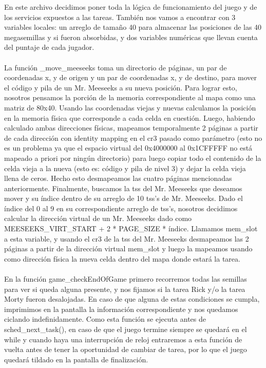 En este archivo decidimos poner toda la lógica de funcionamiento del juego y de los servicios expuestos a las tareas. También nos vamos a encontrar con 3 variables locales: un arreglo de tamaño 40 para almacenar las posiciones de las 40 megasemillas y si fueron absorbidas, y dos variables numéricas que llevan cuenta del puntaje de cada jugador.
\\\\
La función _move_meeseeks toma un directorio de páginas, un par de coordenadas x, y de origen y un par de coordenadas x, y de destino, para mover el código y pila de un Mr. Meeseeks a su nueva posición. Para lograr esto, nosotros pensamos la porción de la memoria correspondiente al mapa como una matriz de 80x40. Usando las coordenadas viejas y nuevas calculamos la posición en la memoria física que corresponde a cada celda en cuestión. Luego, habiendo calculado ambas direcciones físicas, mapeamos temporalmente 2 páginas a partir de cada dirección con identity mapping en el cr3 pasado como parámetro (esto no es un problema ya que el espacio virtual del 0x4000000 al 0x1CFFFFF no está mapeado a priori por ningún directorio) para luego copiar todo el contenido de la celda vieja a la nueva (esto es: código y pila de nivel 3) y dejar la celda vieja llena de ceros. Hecho esto desmapeamos las cuatro páginas mencionadas anteriormente. Finalmente, buscamos la tss del Mr. Meeseeks que deseamos mover y su índice dentro de su arreglo de 10 tss’s de Mr. Meeseeks. Dado el índice del 0 al 9 en su correspondiente arreglo de tss’s, nosotros decidimos calcular la dirección virtual de un Mr. Meeseeks dado como MEESEEKS_VIRT_START + 2 * PAGE_SIZE * índice.
Llamamos mem_slot a esta variable, y usando el cr3 de la tss del Mr. Meeseeks desmapeamos las 2 páginas a partir de la dirección virtual mem_slot y luego la mapeamos usando como dirección física la nueva celda dentro del mapa donde estará la tarea.
\\\\
En la función game_checkEndOfGame primero recorremos todas las semillas para ver si queda alguna presente, y nos fijamos si la tarea Rick y/o la tarea Morty fueron desalojadas. En caso de que alguna de estas condiciones se cumpla, imprimimos en la pantalla la información correspondiente y nos quedamos ciclando indefinidamente. Como esta función se ejecuta antes de sched_next_task(), en caso de que el juego termine siempre se quedará en el while y cuando haya una interrupción de reloj entraremos a esta función de vuelta antes de tener la oportunidad de cambiar de tarea, por lo que el juego quedará tildado en la pantalla de finalización.
